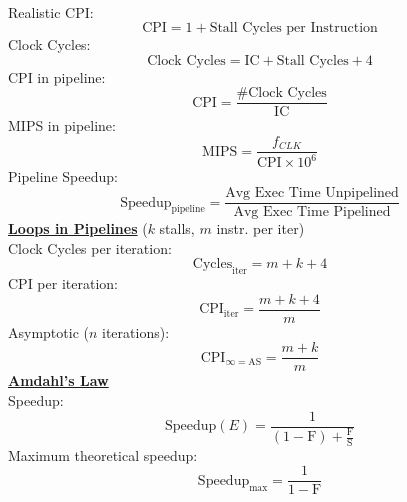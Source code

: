 \documentclass[a4paper,12pt]{article}
\begin{document}
\begin{multicols}{2}
    \\
    Realistic CPI:
    \begin{equation*}
        \text{CPI} = 1 + \text{Stall Cycles per Instruction}
    \end{equation*}
    Clock Cycles:
    \begin{equation*}
        \text{Clock Cycles} = \text{IC} + \text{Stall Cycles} + 4
    \end{equation*}
    CPI in pipeline:
    \begin{equation*}
        \text{CPI} = \frac{\text{\# Clock Cycles}}{\text{IC}}
    \end{equation*}
    MIPS in pipeline:
    \begin{equation*}
        \text{MIPS} = \frac{f_{CLK}}{\text{CPI} \times 10^6}
    \end{equation*}
    Pipeline Speedup:
    \begin{equation*}
        \text{Speedup}_{\text{pipeline}} = \frac{\text{Avg Exec Time Unpipelined}}{\text{Avg Exec Time Pipelined}}
    \end{equation*}
    \textbf{\underline{Loops in Pipelines}} ($k$ stalls, $m$ instr. per iter)
    \\
    Clock Cycles per iteration:
    \begin{equation*}
        \text{Cycles}_{\text{iter}} = m + k + 4
    \end{equation*}
    CPI per iteration:
    \begin{equation*}
        \text{CPI}_{\text{iter}} = \frac{m+k+4}{m}
    \end{equation*}
    Asymptotic ($n$ iterations):
    \begin{equation*}
        \text{CPI}_{\infty = \text{AS}} = \frac{m+k}{m}
    \end{equation*}
    \textbf{\underline{Amdahl's Law}}
    \\
    Speedup:
    \begin{equation*}
        \text{Speedup}(E) = \frac{1}{(1-\text{F})+\frac{\text{F}}{\text{S}}}
    \end{equation*}
    Maximum theoretical speedup:
    \begin{equation*}
        \text{Speedup}_{\max} = \frac{1}{1-\text{F}}
    \end{equation*}

    \end{multicols}


\end{document}
